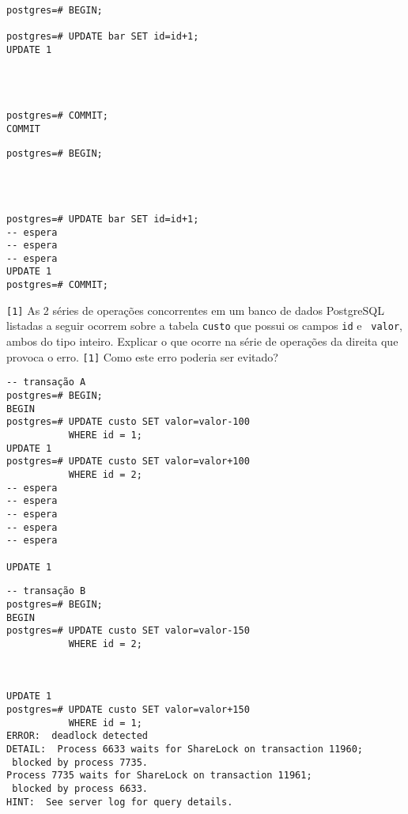 \begin{minipage}[h]{.5\linewidth}
\begin{verbatim}
postgres=# BEGIN;

postgres=# UPDATE bar SET id=id+1;
UPDATE 1




postgres=# COMMIT;
COMMIT
\end{verbatim}
\end{minipage}
\begin{minipage}[h]{.5\linewidth}\vspace{1.5cm}
\begin{verbatim}
postgres=# BEGIN;




postgres=# UPDATE bar SET id=id+1;
-- espera
-- espera
-- espera
UPDATE 1
postgres=# COMMIT;
\end{verbatim}
\end{minipage}


\pagebreak {} {\tt [1]} As 2 séries de operações
concorrentes em um banco de dados PostgreSQL listadas a seguir ocorrem
sobre a tabela {\tt custo} que possui os campos {\tt id} e {\tt
  valor}, ambos do tipo inteiro. Explicar o que ocorre na série de
operações da direita que provoca o erro. {\tt [1]} Como este erro
poderia ser evitado?

\bigskip\footnotesize
\begin{minipage}[h]{.5\linewidth}
\begin{verbatim}
-- transação A
postgres=# BEGIN;
BEGIN
postgres=# UPDATE custo SET valor=valor-100 
           WHERE id = 1;
UPDATE 1
postgres=# UPDATE custo SET valor=valor+100 
           WHERE id = 2;
-- espera
-- espera
-- espera
-- espera
-- espera

UPDATE 1
\end{verbatim}
\end{minipage}
\begin{minipage}[h]{.5\linewidth}
\begin{verbatim}
-- transação B
postgres=# BEGIN;
BEGIN
postgres=# UPDATE custo SET valor=valor-150 
           WHERE id = 2;



UPDATE 1
postgres=# UPDATE custo SET valor=valor+150 
           WHERE id = 1;
ERROR:  deadlock detected
DETAIL:  Process 6633 waits for ShareLock on transaction 11960; 
 blocked by process 7735.
Process 7735 waits for ShareLock on transaction 11961; 
 blocked by process 6633.
HINT:  See server log for query details.

\end{verbatim}
\end{minipage}


